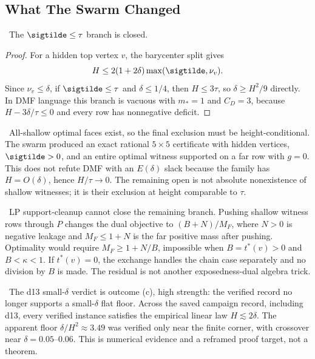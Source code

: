 \subsection{What The Swarm Changed}
\begin{proposition}
\provedbadge\  The \(\sigtilde\leq\tau\) branch is closed.
\end{proposition}
\begin{proof}
For a hidden top vertex \(v\), the barycenter split gives
\[
H\leq2(1+2\delta)\max(\sigtilde,\nu_v).
\]
Since \(\nu_v\leq\delta\), if \(\sigtilde\leq\tau\) and \(\delta\leq1/4\),
then \(H\leq3\tau\), so \(\delta\geq H^2/9\) directly.  In DMF language this
branch is vacuous with \(m_*=1\) and \(C_D=3\), because
\(H-3\delta/\tau\leq0\) and every row has nonnegative deficit.
\end{proof}

\begin{warning}
\modauditbadge\  All-shallow optimal faces exist, so the final exclusion must
be height-conditional.  The swarm produced an exact rational \(5\times5\)
certificate with hidden vertices, \(\sigtilde>0\), and an entire optimal
witness supported on a far row with \(g=0\).  This does not refute DMF with an
\(E(\delta)\) slack because the family has \(H=O(\delta)\), hence
\(H/\tau\to0\).  The remaining open is not absolute nonexistence of shallow
witnesses; it is their exclusion at height comparable to \(\tau\).
\end{warning}

\begin{warning}
\provedbadge\  LP support-cleanup cannot close the remaining branch.  Pushing
shallow witness rows through \(P\) changes the dual objective to
\((B+N)/M_F\), where \(N>0\) is negative leakage and \(M_F\leq1+N\) is the far
positive mass after pushing.  Optimality would require
\(M_F\geq1+N/B\), impossible when \(B=t^*(v)>0\) and \(B<\kappa<1\).  If
\(t^*(v)=0\), the exchange handles the chain case separately and no division
by \(B\) is made.  The residual is not another exposedness-dual algebra trick.
\end{warning}

\begin{numericalresult}
\numbadge\  The d13 small-\(\delta\) verdict is outcome (c), high strength:
the verified record no longer supports a small-\(\delta\) flat floor.  Across
the saved campaign record, including d13, every verified instance satisfies
the empirical linear law \(H\lesssim2\delta\).  The apparent floor
\(\delta/H^2\approx3.49\) was verified only near the finite corner, with
crossover near \(\delta=0.05\)--\(0.06\).  This is numerical evidence and a
reframed proof target, not a theorem.
\end{numericalresult}

